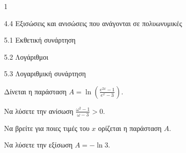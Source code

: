 \begin{ylh}{1}
\item 4.4 Εξισώσεις και ανισώσεις που ανάγονται σε πολυωνυμικές
\item 5.1 Εκθετική συνάρτηση
\item 5.2 Λογάριθμοι
\item 5.3 Λογαριθμική συνάρτηση
\end{ylh}
Δίνεται η παράσταση $A = \ln\left(\frac{e^{2x} - 1}{e^x - 3}\right)$.
\begin{alist}
\item Να λύσετε την ανίσωση $\frac{\omega^2 - 1}{\omega - 3} > 0$.
\item Να βρείτε για ποιες τιμές του $x$ ορίζεται η παράσταση $A$.
\item Να λύσετε την εξίσωση $A = -\ln 3$.
\end{alist}

